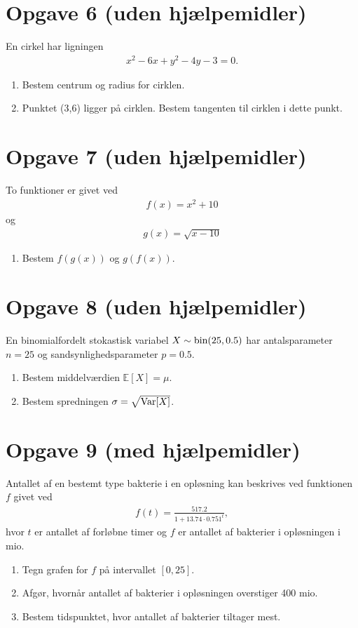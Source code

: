 \section*{Opgave 6 (uden hjælpemidler)}
En cirkel har ligningen 
\begin{align*}
x^2-6x+y^2-4y-3=0.
\end{align*}
\begin{enumerate}[label=\roman*)]
\item Bestem centrum og radius for cirklen. 
\item Punktet (3,6) ligger på cirklen. Bestem tangenten til cirklen i dette punkt. 
\end{enumerate}
\section*{Opgave 7 (uden hjælpemidler)}
To funktioner er givet ved 
\begin{align*}
f(x) = x^2+10
\end{align*}
og 
\begin{align*}
g(x) = \sqrt{x-10}
\end{align*}

\begin{enumerate}[label=\roman*)]
\item Bestem $f(g(x))$ og $g(f(x))$.
\end{enumerate}
\section*{Opgave 8 (uden hjælpemidler)}

En binomialfordelt stokastisk variabel $X \sim \textnormal{bin}(25,0.5)$ har antalsparameter $n=25$ og sandsynlighedsparameter $p=0.5$.
\begin{enumerate}[label=\roman*)]
\item Bestem middelværdien $\mathbb{E}[X] = \mu$.
\item Bestem spredningen $\sigma = \sqrt{\textnormal{Var}[X]}$.
\end{enumerate} 

\section*{Opgave 9 (med hjælpemidler)}

Antallet af en bestemt type bakterie i en opløsning kan beskrives ved funktionen $f$ givet ved
\begin{align*}
f(t) = \frac{517.2}{1+13.74 \cdot 0.751^t},
\end{align*}
hvor $t$ er antallet af forløbne timer og $f$ er antallet af bakterier i opløsningen i mio. 
\begin{enumerate}[label=\roman*)]
\item Tegn grafen for $f$ på intervallet $[0,25]$.
\item Afgør, hvornår antallet af bakterier i opløsningen overstiger 400 mio. 
\item Bestem tidspunktet, hvor antallet af bakterier tiltager mest. 
\end{enumerate}


